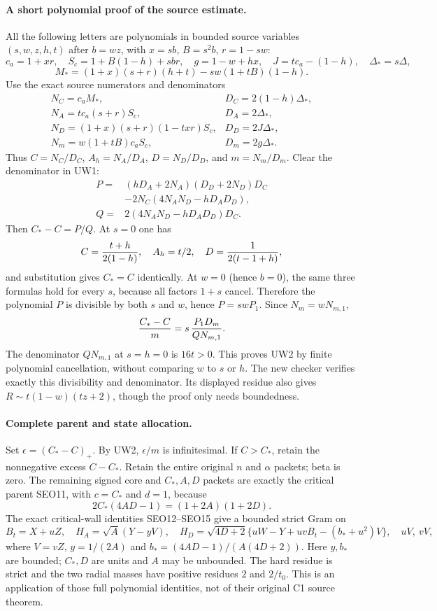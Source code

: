 \paragraph{A short polynomial proof of the source estimate.}
All the following letters are polynomials in bounded source variables
$(s,w,z,h,t)$ after $b=wz$, with $x=sb$, $B=s^2b$, $r=1-sw$:
\[
 c_a=1+xr,\quad S_c=1+B(1-h)+sbr,\quad
 g=1-w+hx,\quad J=t c_a-(1-h),\quad \Delta_*=s\Delta,
\]
\[
 M_*=(1+x)(s+r)(h+t)-sw(1+tB)(1-h).
\]
Use the exact source numerators and denominators
\[
 \begin{array}{ll}
 N_C=c_aM_*,&D_C=2(1-h)\Delta_*,\\
 N_A=t c_a(s+r)S_c,&D_A=2\Delta_*,\\
 N_D=(1+x)(s+r)(1-txr)S_c,&D_D=2J\Delta_*,\\
 N_m=w(1+tB)c_aS_c,&D_m=2g\Delta_*.
 \end{array}
\]
Thus $C=N_C/D_C$, $A_h=N_A/D_A$, $D=N_D/D_D$,
and $m=N_m/D_m$. Clear the denominator in UW1:
\[
 \begin{split}
 P={}&(hD_A+2N_A)(D_D+2N_D)D_C\\
     &-2N_C(4N_AN_D-hD_AD_D),\\
 Q={}&2(4N_AN_D-hD_AD_D)D_C.
 \end{split}                                                  \tag{UW3}
\]
Then $C_*-C=P/Q$. At $s=0$ one has
\[
 C={t+h\over2(1-h)},\quad A_h=t/2,\quad
 D={1\over2(t-1+h)},
\]
and substitution gives $C_*=C$ identically. At $w=0$ (hence
$b=0$), the same three formulas hold for every $s$, because all
factors $1+s$ cancel. Therefore the polynomial $P$ is divisible by
both $s$ and $w$, hence $P=swP_1$. Since $N_m=wN_{m,1}$,
\[
 {C_*-C\over m}=s\,{P_1D_m\over QN_{m,1}}.
\]
The denominator $QN_{m,1}$ at $s=h=0$ is $16t>0$.
This proves UW2 by finite polynomial cancellation, without comparing
$w$ to $s$ or $h$. The new checker verifies exactly this divisibility
and denominator. Its displayed residue also gives
$R\sim t(1-w)(tz+2)$, though the proof only needs boundedness.

\paragraph{Complete parent and state allocation.}
Set $\epsilon=(C_*-C)_+$. By UW2, $\epsilon/m$ is
infinitesimal. If $C>C_*$, retain the nonnegative excess $C-C_*$.
Retain the entire original $n$ and $\alpha$ packets; beta is zero.
The remaining signed core and $C_*,A,D$ packets are exactly the
critical parent SEO11, with $c=C_*$ and $d=1$, because
\[
                  2C_*(4AD-1)=(1+2A)(1+2D).
\]
The exact critical-wall identities SEO12--SEO15 give a bounded strict
Gram on
\[
 B_t=X+uZ,\quad H_A=\sqrt A(Y-yV),\quad
 H_D=\sqrt{4D+2}\{uW-Y+uvB_t-(b_*+u^2)V\},
 \quad uV,\ vV,
\]
where $V=vZ$, $y=1/(2A)$ and
$b_*=(4AD-1)/(A(4D+2))$. Here $y,b_*$ are bounded;
$C_*,D$ are units and $A$ may be unbounded. The hard residue is
strict and the two radial masses have positive residues $2$ and
$2/t_0$. This is an application of those full polynomial identities,
not of their original C1 source theorem.

